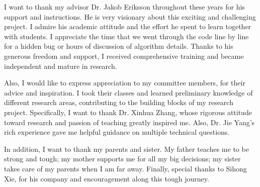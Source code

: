 \acknowledgment

I want to thank my advisor Dr. Jakob Eriksson throughout these years for his support and instructions.
He is very visionary about this exciting and challenging project. 
I admire his academic attitude and the effort he spent to learn together with students.
I appreciate the time that we went through the code line by line for a hidden bug or hours of discussion of algorithm details. 
Thanks to his generous freedom and support, I received comprehensive training and became independent and mature in research.

Also, I would like to express appreciation to my committee members, for their advice and inspiration. 
I took their classes and learned preliminary knowledge of different research areas, contributing to the building blocks of my research project. 
Specifically, I want to thank Dr. Xinhua Zhang, whose rigorous attitude toward research and passion of teaching greatly inspired me. 
Also, Dr. Jie Yang's rich experience gave me helpful guidance on multiple technical questions.

In addition, I want to thank my parents and sister.
My father teaches me to be strong and tough; my mother supports me for all my big decisions; my sister takes care of my parents when I am far away.
Finally, special thanks to Sihong Xie, for his company and encouragement along this tough journey. 
